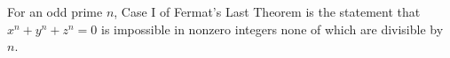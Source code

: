 For an odd prime $n$, Case I of Fermat's Last Theorem is the statement that $x^n + y^n + z^n = 0$ is impossible in nonzero integers none of which are divisible by $n$.
